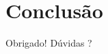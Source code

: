 \documentclass[10pt]{beamer}
\newcommand{\themename}{\textbf{\textsc{metropolis}}\xspace}
\begin{document}
\section{Conclusão}

\begin{frame}[standout]
  Obrigado! Dúvidas ?
\end{frame}









\end{document}
